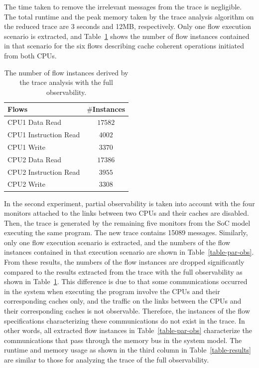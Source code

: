 \documentclass[12pt,frontmatter,copyright,thesis]{usfmanus}
\begin{document}
The time taken to remove the irrelevant messages from the
trace is negligible.  The total runtime and the peak memory
taken by the trace analysis algorithm on the reduced
trace are 3 seconds and 12MB, respectively.  Only one flow execution
scenario is extracted, and 
Table~\ref{table-case-2} shows the number of flow instances contained in that
scenario for the six 
flows describing cache coherent operations initiated from both CPUs.
\begin{table}[tb]
\caption{The number of flow instances derived by the trace analysis with the full observability.}
\begin{center}
\begin{tabular}{|l|c|}
\hline
Flows & $\#$Instances \\
\hline
\hline
CPU1 Data Read			&  $17582$\\
CPU1 Instruction Read		&  $4002$\\
CPU1 Write				&  $3370$\\
\hline
CPU2 Data Read			&  $17386$\\
CPU2 Instruction Read		&  $3955$\\
CPU2 Write				&  $3308$\\
\hline
\end{tabular}
\end{center}
\label{table-case-2}
\end{table}%

In the second experiment, partial observability is taken into account
with the four monitors attached to the links between two CPUs and their
caches are disabled. Then, the trace is generated by the
remaining five monitors from the SoC model executing the
same program.  The new trace contains 15089 messages.  
Similarly, only one flow execution
scenario is extracted, and the numbers of the
flow instances contained in that execution scenario are
shown in Table~\ref{table-par-obs}.  From these results, the
numbers of the flow instances are dropped significantly
compared to the results extracted from the trace with the
full observability as shown in
Table~\ref{table-case-2}. This difference is due to that
some communications occurred in the system when executing
the program involve the CPUs and their corresponding caches
only, and the traffic on the links between the CPUs and
their corresponding caches is not observable. Therefore, the
instances of the flow specifications characterizing these
communications do not exist in the trace. In other words,
all extracted flow instances in Table~\ref{table-par-obs}
characterize the communications that pass through the memory
bus in the system model.  The runtime and memory usage as shown in
the third column in Table~\ref{table-results} are
similar to those for analyzing the trace of the full
observability.
\end{document}
